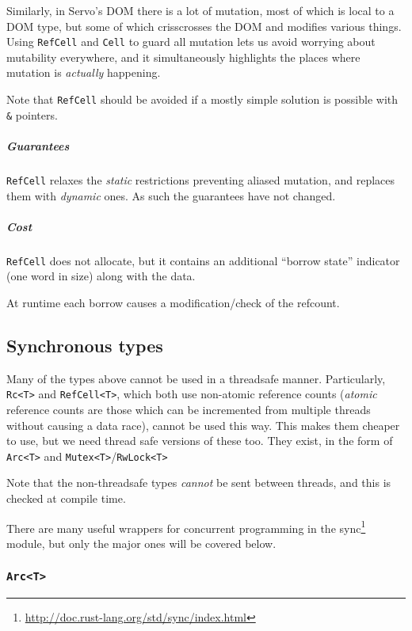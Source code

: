 \documentclass[a4paper,]{book}
\renewcommand{\href}[2]{#2\footnote{\url{#1}}}
\let\oldsubparagraph\subparagraph
\renewcommand{\subparagraph}[1]{\oldsubparagraph{#1}\mbox{}}
\begin{document}
Similarly, in Servo's DOM there is a lot of mutation, most of which is
local to a DOM type, but some of which crisscrosses the DOM and modifies
various things. Using \texttt{RefCell} and \texttt{Cell} to guard all
mutation lets us avoid worrying about mutability everywhere, and it
simultaneously highlights the places where mutation is \emph{actually}
happening.

Note that \texttt{RefCell} should be avoided if a mostly simple solution
is possible with \texttt{\&} pointers.

\subparagraph{Guarantees}\label{guarantees-2}

\texttt{RefCell} relaxes the \emph{static} restrictions preventing
aliased mutation, and replaces them with \emph{dynamic} ones. As such
the guarantees have not changed.

\subparagraph{Cost}\label{cost-2}

\texttt{RefCell} does not allocate, but it contains an additional
``borrow state'' indicator (one word in size) along with the data.

At runtime each borrow causes a modification/check of the refcount.

\subsection{Synchronous types}\label{synchronous-types}

Many of the types above cannot be used in a threadsafe manner.
Particularly, \texttt{Rc\textless{}T\textgreater{}} and
\texttt{RefCell\textless{}T\textgreater{}}, which both use non-atomic
reference counts (\emph{atomic} reference counts are those which can be
incremented from multiple threads without causing a data race), cannot
be used this way. This makes them cheaper to use, but we need thread
safe versions of these too. They exist, in the form of
\texttt{Arc\textless{}T\textgreater{}} and
\texttt{Mutex\textless{}T\textgreater{}}/\texttt{RwLock\textless{}T\textgreater{}}

Note that the non-threadsafe types \emph{cannot} be sent between
threads, and this is checked at compile time.

There are many useful wrappers for concurrent programming in the
\href{http://doc.rust-lang.org/std/sync/index.html}{sync} module, but
only the major ones will be covered below.

\subsubsection{\texorpdfstring{\texttt{Arc\textless{}T\textgreater{}}}{Arc\textless{}T\textgreater{}}}\label{arct}
\end{document}
